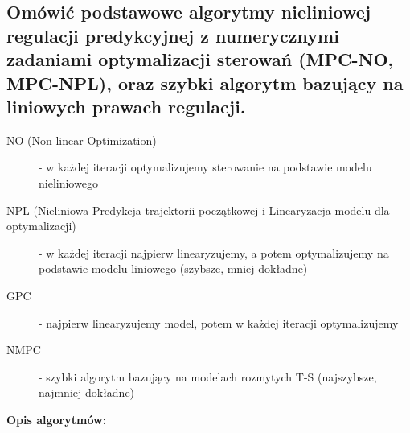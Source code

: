 \subsection{Omówić podstawowe algorytmy nieliniowej regulacji predykcyjnej z numerycznymi zadaniami optymalizacji sterowań (MPC-NO, MPC-NPL), oraz szybki algorytm bazujący na liniowych prawach regulacji.}
\begin{description}
    \item[NO (Non-linear Optimization)] - w każdej iteracji optymalizujemy sterowanie na podstawie modelu nieliniowego
    \item[NPL (Nieliniowa Predykcja trajektorii początkowej i Linearyzacja modelu dla optymalizacji)] - w każdej iteracji najpierw linearyzujemy, a potem optymalizujemy na podstawie modelu liniowego (szybsze, mniej dokładne)
    \item[GPC] - najpierw linearyzujemy model, potem w każdej iteracji optymalizujemy
    \item[NMPC] - szybki algorytm bazujący na modelach rozmytych T-S
(najszybsze, najmniej dokładne)
\end{description}

\textbf{Opis algorytmów:}

